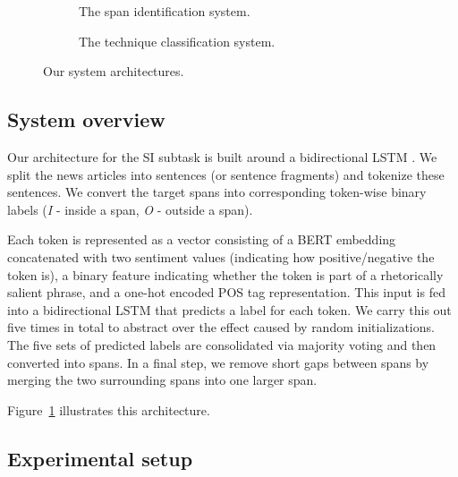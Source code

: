 \documentclass[11pt]{article}
\begin{document}
\begin{figure}
\centering
\begin{subfigure}[b]{.35\textwidth}
    \centering
    
    \caption{The span identification system.}
    \label{fig:task1-architecture}
\end{subfigure}
\begin{subfigure}[b]{.56\textwidth}
    \hspace{-2em}
    \centering
    
    \caption{The technique classification system.}
    \label{fig:task2-architecture}
\end{subfigure}
\caption{Our system architectures.}
\label{fig:system-architectures}
\end{figure}

\subsection{System overview}

Our architecture for the SI subtask is built around a bidirectional LSTM \cite{graves2005framewise}.
We split the news articles into sentences (or sentence fragments) and tokenize these sentences. We convert the target spans into corresponding token-wise binary labels (\textit{I} - inside a span, \textit{O} - outside a span).

Each token is represented as a vector consisting of a
BERT embedding \cite{devlin2019bert} concatenated with two sentiment values (indicating how positive/negative the token is), a binary feature indicating whether the token is part of a rhetorically salient phrase, and a one-hot encoded POS tag representation.
This input is fed into a bidirectional LSTM that predicts a label for each token. 
We carry this out five times in total to abstract over the effect caused by random initializations.
The five sets of predicted labels are consolidated via majority voting and then converted into spans.
In a final step, we remove short gaps between spans by merging the two surrounding spans into one larger span.

Figure~\ref{fig:task1-architecture} illustrates this architecture.

\subsection{Experimental setup}
\end{document}
